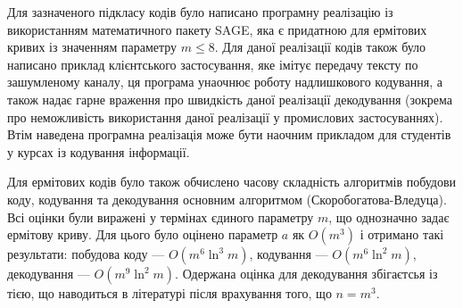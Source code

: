 \documentclass[a4paper,12pt,oneside]{article}
\begin{document}
Для зазначеного підкласу кодів було написано програмну реалізацію із використанням математичного пакету SAGE, яка є придатною для ермітових кривих із значенням 
параметру $m \le 8$. Для даної реалізації кодів також було написано приклад клієнтського застосування, яке імітує передачу тексту по зашумленому каналу, ця 
програма унаочнює роботу надлишкового кодування, а також надає гарне враження про швидкість даної реалізації декодування (зокрема про неможливість використання 
даної реалізації у промислових застосуваннях). Втім наведена програмна реалізація може бути наочним прикладом для студентів у курсах із кодування інформації.

Для ермітових кодів було також обчислено часову складність алгоритмів побудови коду, кодування та декодування основним алгоритмом (Скоробогатова-Вледуца). 
Всі оцінки були виражені у термінах єдиного параметру $m$, що однозначно задає ермітову криву. Для цього було оцінено параметр $a$ як $O(m^3)$ і отримано 
такі результати: побудова коду --- $O(m^6 \ln^3 m)$, кодування --- $O(m^6 \ln^2 m)$, декодування --- $O(m^9 \ln^2 m)$. Одержана оцінка для декодування 
збігаєтсья із тією, що наводиться в літературі після врахування того, що $n=m^3$.
\nocite{*}

\clearpage
{}
{}

\end{document}
